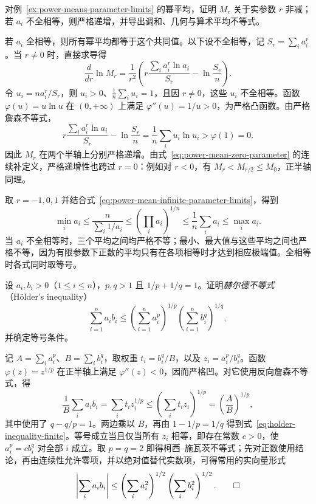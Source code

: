 \documentclass[UTF8,12pt,a4paper,fontset=fandol]{ctexbook}
\begin{document}
\begin{example}
\label{ex:power-mean-monotonicity-by-convexity}
对例~\ref{ex:power-means-parameter-limits} 的幂平均，证明 $M_r$ 关于实参数 $r$ 非减；若 $a_i$ 不全相等，则严格递增，并导出调和、几何与算术平均不等式。
\end{example}

\begin{solve}
若 $a_i$ 全相等，则所有幂平均都等于这个共同值。以下设不全相等，记 $S_r=\sum_i a_i^r$。当 $r\neq0$ 时，直接求导得
\[
    \frac{d}{dr}\ln M_r
    =\frac1{r^2}\left(
       r\frac{\sum_i a_i^r\ln a_i}{S_r}-\ln\frac{S_r}n\right).
\]
令 $u_i=na_i^r/S_r$，则 $u_i>0$、$\frac1n\sum_i u_i=1$，且因 $r\neq0$，这些 $u_i$ 不全相等。函数 $\varphi(u)=u\ln u$ 在 $(0,+\infty)$ 上满足 $\varphi''(u)=1/u>0$，为严格凸函数。由严格詹森不等式，
\[
    r\frac{\sum_i a_i^r\ln a_i}{S_r}-\ln\frac{S_r}n
    =\frac1n\sum_i u_i\ln u_i>\varphi(1)=0.
\]
因此 $M_r$ 在两个半轴上分别严格递增。由式~\eqref{eq:power-mean-zero-parameter} 的连续补定义，严格递增性也跨过 $r=0$：例如对 $r<0$，有 $M_r<M_{r/2}\leq M_0$，正半轴同理。

取 $r=-1,0,1$ 并结合式~\eqref{eq:power-mean-infinite-parameter-limits}，得到
\begin{equation}
    \min_i a_i
    \leq\frac{n}{\sum_i1/a_i}
    \leq\left(\prod_i a_i\right)^{1/n}
    \leq\frac1n\sum_i a_i
    \leq\max_i a_i.
    \label{eq:harmonic-geometric-arithmetic-mean-chain}
\end{equation}
当 $a_i$ 不全相等时，三个平均之间均严格不等；最小、最大值与这些平均之间也严格不等，因为有限参数下正数的平均只有在各项相等时才达到相应极端值。全相等时各式同时取等号。
\end{solve}

\begin{example}
\label{ex:holder-inequality-from-concavity}
设 $a_i,b_i>0$（$1\leq i\leq n$），$p,q>1$ 且 $1/p+1/q=1$。证明\emph{赫尔德不等式}（H\"older's inequality）
\begin{equation}
    \sum_{i=1}^n a_ib_i
    \leq\left(\sum_{i=1}^n a_i^p\right)^{1/p}
         \left(\sum_{i=1}^n b_i^q\right)^{1/q},
    \label{eq:holder-inequality-finite}
\end{equation}
并确定等号条件。
\end{example}

\begin{solve}
记 $A=\sum_i a_i^p$、$B=\sum_i b_i^q$，取权重 $t_i=b_i^q/B$，以及 $z_i=a_i^p/b_i^q$。函数 $\varphi(z)=z^{1/p}$ 在正半轴上满足 $\varphi''(z)<0$，因而严格凹。对它使用反向詹森不等式，得
\[
    \frac1B\sum_i a_ib_i
    =\sum_i t_i z_i^{1/p}
    \leq\left(\sum_i t_i z_i\right)^{1/p}
    =\left(\frac AB\right)^{1/p},
\]
其中使用了 $q-q/p=1$。两边乘以 $B$，再由 $1-1/p=1/q$ 得到式~\eqref{eq:holder-inequality-finite}。等号成立当且仅当所有 $z_i$ 相等，即存在常数 $c>0$，使 $a_i^p=cb_i^q$ 对全部 $i$ 成立。取 $p=q=2$ 即得柯西--施瓦茨不等式；先对正数使用结论，再由连续性允许零项，并以绝对值替代实数项，可得常用的实向量形式
\[
    \left|\sum_i a_ib_i\right|
    \leq\left(\sum_i a_i^2\right)^{1/2}
         \left(\sum_i b_i^2\right)^{1/2}.
    \qedhere
\]
\end{solve}
\end{document}
